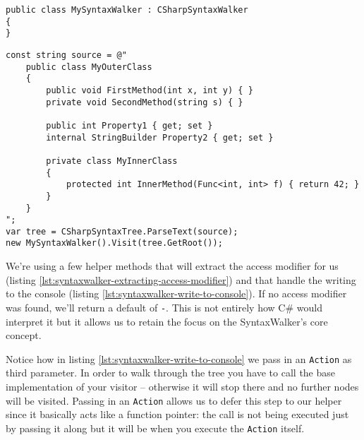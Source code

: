 \begin{minipage}{\linewidth}
\begin{lstlisting}[label={lst:syntaxwalker-getting-started}]
public class MySyntaxWalker : CSharpSyntaxWalker
{
}
\end{lstlisting}

\begin{lstlisting}[label={lst:syntaxwalker-visiting-from-root}]
const string source = @"
	public class MyOuterClass
	{
	    public void FirstMethod(int x, int y) { }
	    private void SecondMethod(string s) { }
	
	    public int Property1 { get; set }
	    internal StringBuilder Property2 { get; set }
	
	    private class MyInnerClass
	    {
	        protected int InnerMethod(Func<int, int> f) { return 42; }
	    }
	}
";
var tree = CSharpSyntaxTree.ParseText(source);
new MySyntaxWalker().Visit(tree.GetRoot());
\end{lstlisting}
\end{minipage}

We're using a few helper methods that will extract the access modifier for us (listing \ref{lst:syntaxwalker-extracting-access-modifier}) and that handle the writing to the console (listing \ref{lst:syntaxwalker-write-to-console}). If no access modifier was found, we'll return a default of \texttt{-}. This is not entirely how C\# would interpret it but it allows us to retain the focus on the SyntaxWalker's core concept.

Notice how in listing \ref{lst:syntaxwalker-write-to-console} we pass in an \texttt{Action} as third parameter. In order to walk through the tree you have to call the base implementation of your visitor -- otherwise it will stop there and no further nodes will be visited. Passing in an \texttt{Action} allows us to defer this step to our helper since it basically acts like a function pointer: the call is not being executed just by passing it along but it will be when you execute the \texttt{Action} itself.

\clearpage

